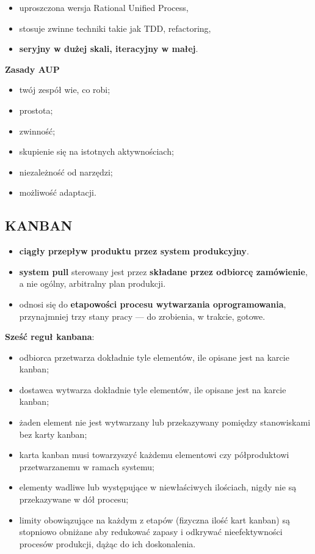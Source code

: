 \documentclass[a4paper]{article}
\begin{document}
    \begin{itemize}
        \item uproszczona wersja Rational Unified Process,
        \item stosuje zwinne techniki takie jak TDD, refactoring,
        \item \textbf{seryjny w dużej skali, iteracyjny w małej}.
    \end{itemize}

    \textbf{Zasady AUP}
    \begin{itemize}
        \item twój zespół wie, co robi;
        \item prostota;
        \item zwinność;
        \item skupienie się na istotnych aktywnościach;
        \item niezależność od narzędzi;
        \item możliwość adaptacji.
    \end{itemize}



    \subsection{KANBAN}


    \begin{itemize}
        \item \textbf{ciągły przepływ produktu przez system produkcyjny}.
        \item \textbf{system pull} sterowany
        jest przez \textbf{składane przez odbiorcę zamówienie}, a nie ogólny, arbitralny plan produkcji.
        \item odnosi się do \textbf{etapowości procesu wytwarzania
        oprogramowania}, przynajmniej trzy stany pracy — do zrobienia, w trakcie, gotowe.
    \end{itemize}


    \textbf{Sześć reguł kanbana}:
    \begin{itemize}
        \item odbiorca przetwarza dokładnie tyle elementów, ile opisane jest na karcie kanban;
        \item dostawca wytwarza dokładnie tyle elementów, ile opisane jest na karcie kanban;
        \item żaden element nie jest wytwarzany lub przekazywany pomiędzy stanowiskami bez karty kanban;
        \item karta kanban musi towarzyszyć każdemu elementowi czy półproduktowi przetwarzanemu w ramach systemu;
        \item elementy wadliwe lub występujące w niewłaściwych ilościach, nigdy nie są przekazywane w dół procesu;
        \item limity obowiązujące na każdym z etapów (fizyczna ilość kart kanban) są stopniowo obniżane aby redukować zapasy i
        odkrywać nieefektywności procesów produkcji, dążąc do ich doskonalenia.
    \end{itemize}
\end{document}

